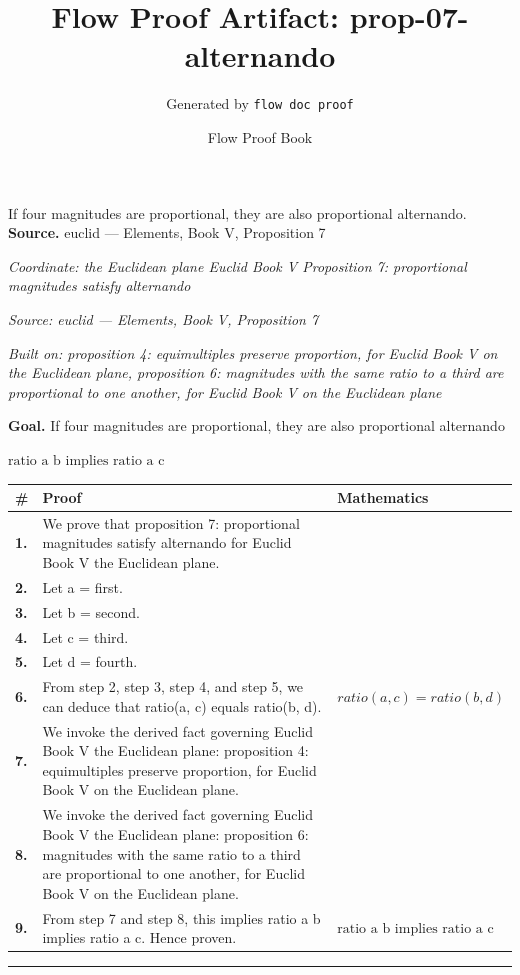 \documentclass[11pt]{article}
\title{Flow Proof Artifact: prop-07-alternando}
\author{Generated by \texttt{flow doc proof}}
\date{Flow Proof Book}
\theoremstyle{definition}
\begin{document}
\maketitle
If four magnitudes are proportional, they are also proportional alternando.\\[0.5em]
\textbf{Source.} euclid — Elements, Book V, Proposition 7\\[0.5em]
\bigskip
{}\par
\smallskip\noindent\textit{Coordinate: the Euclidean plane \cdot Euclid Book V \cdot Proposition 7: proportional magnitudes satisfy alternando}\par
\smallskip\noindent\textit{Source: euclid — Elements, Book V, Proposition 7}\par
\smallskip\noindent\textit{Built on: proposition 4: equimultiples preserve proportion, for Euclid Book V on the Euclidean plane, proposition 6: magnitudes with the same ratio to a third are proportional to one another, for Euclid Book V on the Euclidean plane}\par
\medskip
\noindent\textbf{Goal.} If four magnitudes are proportional, they are also proportional alternando\par
\noindent$\displaystyle \text{ratio a b implies ratio a c}$\par
\medskip
\noindent
\begin{tabular}{@{} >{\raggedright\arraybackslash}p{} >{\raggedright\arraybackslash}p{} >{\raggedleft\arraybackslash}p{} @{}}
\textbf{\#} & \textbf{Proof} & \textbf{Mathematics} \\
\midrule
\textbf{1.} & We prove that proposition 7: proportional magnitudes satisfy alternando for Euclid Book V the Euclidean plane. & \\[0.45em]
\textbf{2.} & Let a = first. & \\[0.45em]
\textbf{3.} & Let b = second. & \\[0.45em]
\textbf{4.} & Let c = third. & \\[0.45em]
\textbf{5.} & Let d = fourth. & \\[0.45em]
\textbf{6.} & From step 2, step 3, step 4, and step 5, we can deduce that ratio(a, c) equals ratio(b, d). & $\displaystyle ratio(a, c) = ratio(b, d)$ \\[0.45em]
\textbf{7.} & We invoke the derived fact governing Euclid Book V the Euclidean plane: proposition 4: equimultiples preserve proportion, for Euclid Book V on the Euclidean plane. & \\[0.45em]
\textbf{8.} & We invoke the derived fact governing Euclid Book V the Euclidean plane: proposition 6: magnitudes with the same ratio to a third are proportional to one another, for Euclid Book V on the Euclidean plane. & \\[0.45em]
\textbf{9.} & From step 7 and step 8, this implies ratio a b implies ratio a c. Hence proven. & $\displaystyle \text{ratio a b implies ratio a c}$ \\[0.45em]
\bottomrule
\end{tabular}
\label{thm:Geometry-Euclid Book V-proposition_7_proportional_magnitudes_satisfy_alternando}
\par\medskip\hrule
\end{document}
